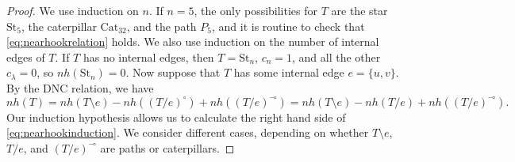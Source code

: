 \documentclass[12pt]{amsart}  %
\theoremstyle{definition}
\theoremstyle{remark}
\numberwithin{equation}{section}
\begin{document}
\begin{proof}
We use induction on $n$. If $n=5$, the only possibilities for $T$ are the star $\text{St}_5$, the caterpillar $\text{Cat}_{32}$, and the path $P_5$, and it is routine to check that \eqref{eq:nearhookrelation} holds. We also use induction on the number of internal edges of $T$. If $T$ has no internal edges, then $T=\text{St}_n$, $c_n=1$, and all the other $c_\lambda=0$, so $nh(\text{St}_n)=0$. Now suppose that $T$ has some internal edge $e=\{u,v\}$. By the DNC relation, we have
\begin{equation}\label{eq:nearhookinduction}
nh(T)=nh(T\setminus e)-nh((T/e)^\circ)+nh((T/e)^\multimap)=nh(T\setminus e)-nh(T/e)+nh((T/e)^\multimap).
\end{equation}
Our induction hypothesis allows us to calculate the right hand side of \eqref{eq:nearhookinduction}. We consider different cases, depending on whether $T\setminus e$, $T/e$, and $(T/e)^\multimap$ are paths or caterpillars. 


\end{proof}
\end{document}
